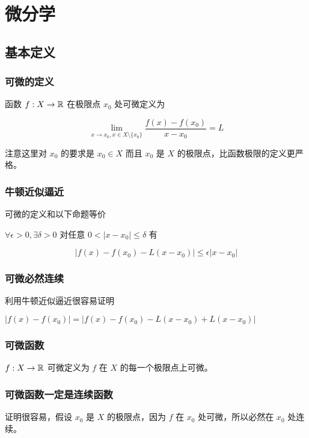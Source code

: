 \chapter{微分学}

\section{基本定义}

\subsection{可微的定义}

函数 $f: X \to \mathbb{R}$ 在极限点 $x_0$ 处可微定义为

\[
    \lim_{x \to x_0, x \in X \setminus \{x_0\} }\frac{f(x) -f(x_0)}{x -x_0} = L
\]

注意这里对 $x_0$ 的要求是 $x_0 \in X$ 而且 $x_0$ 是 $X$ 的极限点，比函数极限的定义更严格。

\subsection{牛顿近似逼近}

可微的定义和以下命题等价

$\forall \epsilon > 0, \exists \delta >0 $ 对任意 $0 < \lvert x -x_0\rvert \le \delta $ 有

\[
    \lvert f(x) - f(x_0) - L(x-x_0) \rvert \le \epsilon \lvert x -x_0 \rvert
\]


\subsection{可微必然连续}

利用牛顿近似逼近很容易证明

$\lvert f(x) -f(x_0)\rvert = \lvert f(x) -f(x_0) - L(x-x_0) + L(x-x_0)\rvert $

\subsection{可微函数}

$f: X \to \mathbb{R}$ 可微定义为 $f$ 在 $X$ 的每一个极限点上可微。

\subsection{可微函数一定是连续函数}

证明很容易，假设 $x_0$ 是 $X$ 的极限点，因为 $f$ 在 $x_0$ 处可微，所以必然在 $x_0$ 处连续。

